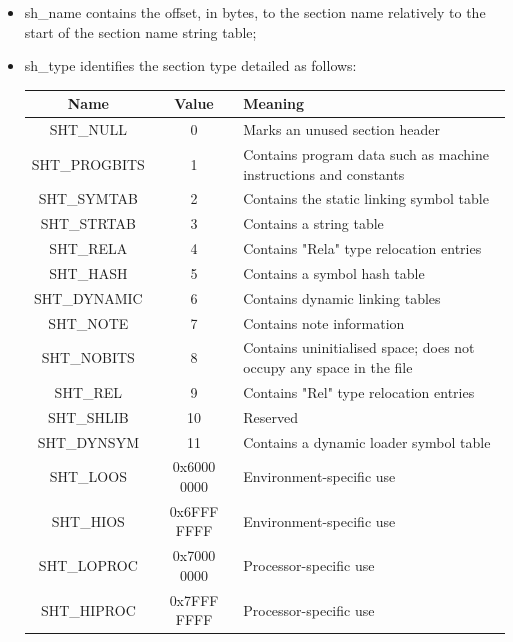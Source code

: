 \begin{itemize}
\item {\ttfamily sh\_name} contains the offset, in bytes, to the section name relatively to the start of the section name string table;
\item {\ttfamily sh\_type} identifies the section type detailed as follows:
\begin{center}
                                \begin{tabular}{|c|c|p{6cm}|} \hline \textbf{Name} & \textbf{Value} & \textbf{Meaning} \\ \hline
                {\ttfamily SHT\_NULL} & 0 & Marks an unused section header \\ \hline {\ttfamily SHT\_PROGBITS} &
                1 & Contains program data such as machine instructions and constants \\ \hline {\ttfamily
                SHT\_SYMTAB} & 2 & Contains the static linking symbol table \\ \hline {\ttfamily SHT\_STRTAB} &
                3 & Contains a string table \\ \hline {\ttfamily SHT\_RELA} & 4 & Contains "Rela" type
                relocation entries \\ \hline {\ttfamily SHT\_HASH} & 5 & Contains a symbol hash table \\ \hline
                {\ttfamily SHT\_DYNAMIC} & 6 & Contains dynamic linking tables\\ \hline {\ttfamily SHT\_NOTE} &
                7 & Contains note information\\ \hline {\ttfamily SHT\_NOBITS} & 8 & Contains uninitialised
                space; does not occupy any space in the file\\ \hline {\ttfamily SHT\_REL} & 9 & Contains "Rel"
                type relocation entries\\ \hline {\ttfamily SHT\_SHLIB} & 10 & Reserved\\ \hline {\ttfamily
                SHT\_DYNSYM} & 11 & Contains a dynamic loader symbol table\\ \hline {\ttfamily SHT\_LOOS} &
                0x6000 0000 & Environment-specific use\\ \hline {\ttfamily SHT\_HIOS} & 0x6FFF FFFF &
                Environment-specific use \\ \hline {\ttfamily SHT\_LOPROC} & 0x7000 0000 & Processor-specific
            use\\ \hline {\ttfamily SHT\_HIPROC} & 0x7FFF FFFF & Processor-specific use\\ \hline \end{tabular}

\end{center}
\end{itemize}
